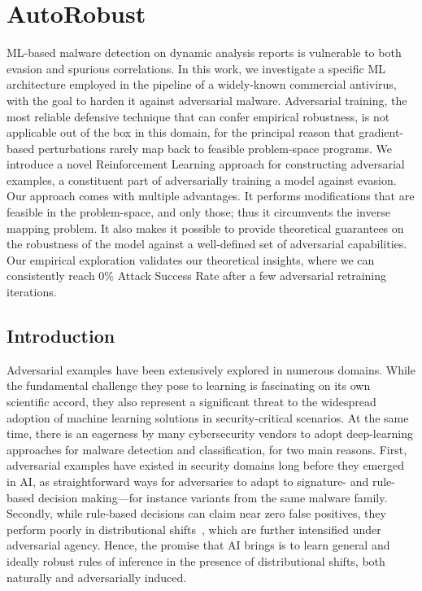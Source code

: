 \chapter{AutoRobust}\label{ch:autorobust}
ML-based malware detection on dynamic analysis reports is vulnerable to both evasion and spurious correlations. In this work, we investigate a specific ML architecture employed in the pipeline of a widely-known commercial antivirus, with the goal to harden it against adversarial malware.
Adversarial training, the most reliable defensive technique that can confer empirical robustness, is not applicable out of the box in this domain, for the principal reason that gradient-based perturbations rarely map back to feasible problem-space programs. 
We introduce a novel Reinforcement Learning approach for constructing adversarial examples, a constituent part of adversarially training a model against evasion. Our approach comes with multiple advantages. It performs modifications that are feasible in the problem-space, and only those; thus it circumvents the inverse mapping problem. It also makes it possible to provide theoretical guarantees on the robustness of the model against a well-defined set of adversarial capabilities. Our empirical exploration validates our theoretical insights, where we can consistently reach 0\% Attack Success Rate after a few adversarial retraining iterations.

\section{Introduction}
Adversarial examples have been extensively explored in numerous domains. While the fundamental challenge they pose to learning is fascinating on its own scientific accord, they also represent a significant threat to the widespread adoption of machine learning solutions in security-critical scenarios.
At the same time, there is an eagerness by many cybersecurity vendors to adopt deep-learning approaches for malware detection and classification, for two main reasons.
First, adversarial examples have existed in security domains long before they emerged in \gls{AI}, as straightforward ways for adversaries to adapt to signature- and rule-based decision making---for instance variants from the same malware family.
Secondly, while rule-based decisions can claim near zero false positives, they perform poorly in distributional shifts~\cite{upadhyay2021towards}, which are further intensified under adversarial agency.
Hence, the promise that \gls{AI} brings is to learn general and ideally robust rules of inference in the presence of distributional shifts, both naturally and adversarially induced.

